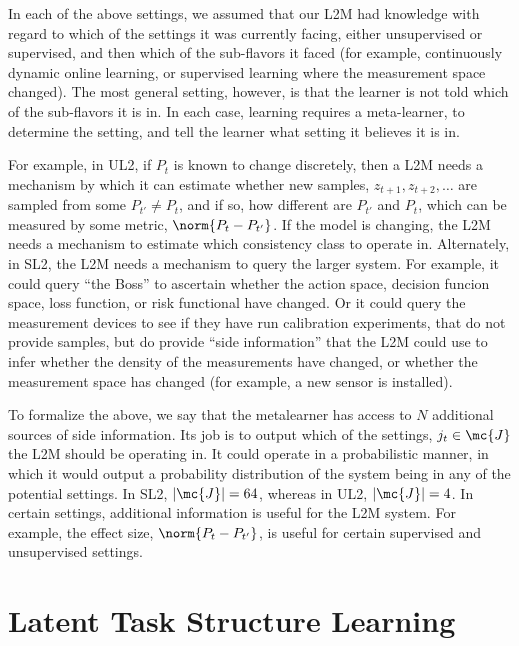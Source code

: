 \documentclass{article}
\begin{document}


In each of the above settings, we assumed that our L2M had  knowledge with regard to which of the  settings it was currently facing, either unsupervised or supervised, and then which of the sub-flavors it faced (for example, continuously dynamic online learning, or supervised learning where the measurement space changed).  The most general setting, however, is that the learner is not told which of the sub-flavors it is in.  In each case, learning requires a meta-learner, to determine the setting, and tell the learner what setting it believes it is in. 

For example, in UL2,  if $P_t$ is known to change discretely, then a L2M needs a mechanism by which it can estimate whether  new samples, $z_{t+1}, z_{t+2},\ldots$ are sampled from some $P_{t'} \neq P_t$, and if so, how different are $P_{t'}$ and $P_t$, which can be measured by some metric, $\norm{P_t - P_{t'}}$.  If the model is changing, the L2M needs a mechanism to estimate which consistency class to operate in. Alternately, in SL2, the L2M needs a mechanism to query the larger system.  For example, it could query ``the Boss'' to ascertain whether the action space, decision funcion space, loss function, or risk functional have changed.  Or it could query the measurement devices to see if they have run calibration experiments, that do not provide samples, but do provide ``side information'' that the L2M could use to infer whether the density of the measurements have changed, or whether the measurement space has changed (for example, a new sensor is installed).  

To formalize the above, we say that the metalearner has access to $N$ additional sources of side information.  Its job is to output which of the settings, $j_t \in \mc{J}$ the L2M should be operating in. It could operate in a probabilistic manner, in which it would output a probability distribution of the system being in any of the potential settings.  In SL2, $|\mc{J}|=64$, whereas in UL2, $|\mc{J}|=4$.  In certain settings, additional information is useful for the L2M system. For example, the effect size,  $\norm{P_t - P_{t'}}$, is useful for certain supervised and unsupervised settings. 



\section{Latent Task Structure Learning}
\label{sec:struct}
\end{document}
